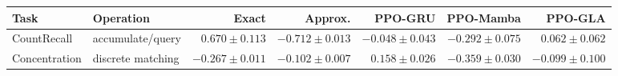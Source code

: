 \begin{tabular}{llrrrrr}
\toprule
Task & Operation & Exact & Approx. & PPO-GRU & PPO-Mamba & PPO-GLA \\
\midrule
CountRecall & accumulate/query & $0.670\pm0.113$ & $-0.712\pm0.013$ & $-0.048\pm0.043$ & $-0.292\pm0.075$ & $0.062\pm0.062$ \\
Concentration & discrete matching & $-0.267\pm0.011$ & $-0.102\pm0.007$ & $0.158\pm0.026$ & $-0.359\pm0.030$ & $-0.099\pm0.100$ \\
\bottomrule
\end{tabular}
